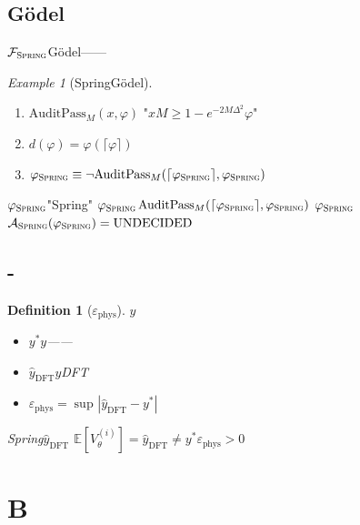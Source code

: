 \documentclass[12pt,a4paper]{article}
\newtheorem{definition}[theorem]{Definition}
\theoremstyle{remark}
\newtheorem{example}[theorem]{Example}
\newcommand{\E}{\mathbb{E}}
\newcommand{\Fset}{\mathcal{F}}
\newcommand{\Spring}{\textsc{Spring}}
\begin{document}
\subsection{G\"odel}

$\Fset_{\Spring}$G\"odel——

\begin{example}[SpringG\"odel]

\begin{enumerate}[label=(\arabic*), itemsep=3pt]
    \item $\mathrm{AuditPass}_M(x, \varphi)$
    "$x$$M$$\geq 1-e^{-2M\Delta^2}$$\varphi$"
    \item $d(\varphi) = \varphi(\lceil \varphi \rceil)$
    \item $\varphi_{\Spring} \equiv \neg \mathrm{AuditPass}_M(\lceil \varphi_{\Spring} \rceil, \varphi_{\Spring})$
\end{enumerate}
$\varphi_{\Spring}$"Spring"
$\varphi_{\Spring}$$\mathrm{AuditPass}_M(\lceil \varphi_{\Spring} \rceil, \varphi_{\Spring})$
$\varphi_{\Spring}$
$\mathcal{A}_{\Spring}(\varphi_{\Spring}) = \text{UNDECIDED}$
\end{example}

\subsection{-}

\begin{definition}[$\varepsilon_{\text{phys}}$]
$y$
\begin{itemize}[itemsep=2pt]
    \item $y^*$$y$——
    \item $\hat{y}_{\text{DFT}}$$y$DFT
    \item $\varepsilon_{\text{phys}} = \sup_{\text{}} |\hat{y}_{\text{DFT}} - y^*|$
\end{itemize}
Spring$\hat{y}_{\text{DFT}}$
$\E[V^{(i)}_\theta] = \hat{y}_{\text{DFT}} \neq y^*$$\varepsilon_{\text{phys}} > 0$

\end{definition}

\newpage

\section{B}
\end{document}
